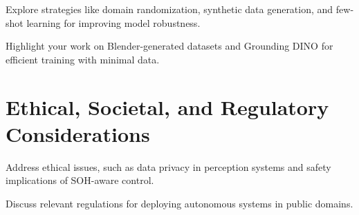 Explore strategies like domain randomization, synthetic data generation, and few-shot learning for improving model robustness.


Highlight your work on Blender-generated datasets and Grounding DINO for efficient training with minimal data.


\section{Ethical, Societal, and Regulatory Considerations}


Address ethical issues, such as data privacy in perception systems and safety implications of SOH-aware control.

Discuss relevant regulations for deploying autonomous systems in public domains.


\endinput